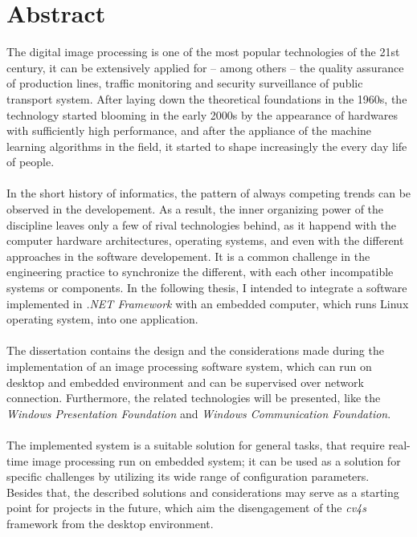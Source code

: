 \chapter*{Abstract}

The digital image processing is one of the most popular technologies of the 21st century, it can be extensively applied for -- among others -- the quality assurance of production lines, traffic monitoring and security surveillance of public transport system. After laying down the theoretical foundations in the 1960s, the technology started blooming in the early 2000s by the appearance of hardwares with sufficiently high performance, and after the appliance of the machine learning algorithms in the field, it started to shape increasingly the every day life of people. \\
\\
In the short history of informatics, the pattern of always competing trends can be observed in the developement. As a result, the inner organizing power of the discipline leaves only a few of rival technologies behind, as it happend with the computer hardware architectures, operating systems, and even with the different approaches in the software developement. It is a common challenge in the engineering practice to synchronize the different, with each other incompatible systems or components. In the following thesis, I intended to integrate a software implemented in \emph{.NET Framework} with an embedded computer, which runs Linux operating system, into one application.\\
\\
The dissertation contains the design and the considerations made during the implementation of an image processing software system, which can run on desktop and embedded environment and can be supervised over network connection. Furthermore, the related technologies will be presented, like the \emph{Windows Presentation Foundation} and \emph{Windows Communication Foundation}. \\
\\
The implemented system is a suitable solution for general tasks, that require real-time image processing run on embedded system; it can be used as a solution for specific challenges by utilizing its wide range of configuration parameters.
\\

Besides that, the described solutions and considerations may serve as a starting point for projects in the future, which aim the disengagement of the \emph{cv4s} framework from the desktop environment. 
